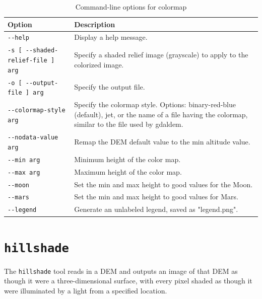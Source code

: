 \begin{longtable}{|l|p{10cm}|}
\caption{Command-line options for colormap}
\label{tbl:colormap}
\endfirsthead
\endhead
\endfoot
\endlastfoot
\hline
Option & Description \\ \hline \hline
\verb#--help# & Display a help message. \\ \hline
\verb#-s [ --shaded-relief-file ] arg# & Specify a shaded relief image (grayscale) to apply to the colorized image. \\ \hline
\verb#-o [ --output-file ] arg# & Specify the output file. \\ \hline
\verb#--colormap-style arg# & Specify the colormap style. Options: binary-red-blue (default), jet, or the name of a file having the colormap, similar to the file used by gdaldem. \\ \hline
\verb#--nodata-value arg# & Remap the DEM default value to the min altitude value. \\ \hline
\verb#--min arg# & Minimum height of the color map. \\ \hline
\verb#--max arg# & Maximum height of the color map. \\ \hline
\verb#--moon# & Set the min and max height to good values for the Moon. \\ \hline
\verb#--mars# & Set the min and max height to good values for Mars. \\ \hline
\verb#--legend# & Generate an unlabeled legend, saved as "legend.png". \\ \hline

\end{longtable}

\section{{\tt hillshade}}
\label{sec:hillshade}

The \verb#hillshade# tool reads in a DEM and outputs an image of that
DEM as though it were a three-dimensional surface, with every pixel
shaded as though it were illuminated by a light from a specified
location.

